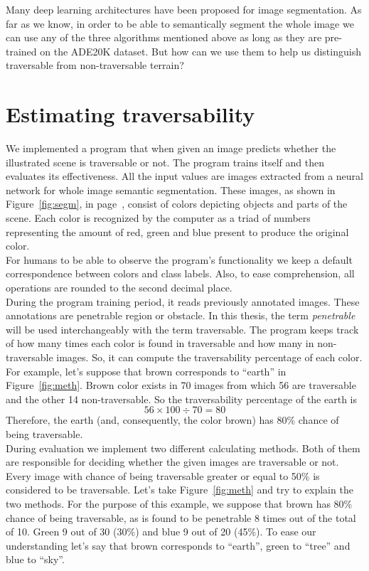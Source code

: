 \documentclass[12pt,a4paper,table,dvipsnames,tikz]{report}
\newcommand{\alleg}{\enquote}
\newcommand{\term}{\textit}
\newcommand{\acronym}{\MakeUppercase}
\newcommand{\bl}[1]{{\hypersetup{linkcolor=blue}#1}}
\begin{document}
	
	Many deep learning architectures have been proposed for image segmentation. As far as
	we know, in order to be able to semantically segment the whole image we can use any 
	of the three algorithms mentioned above as long as they are pre-trained on the 
	\acronym{ade20k} dataset. But how can we use them to help us distinguish traversable 
	from non-traversable terrain?
	\\
		
	\section{Estimating traversability}
	\label{sec:fg:impl}
	
	We implemented a program that when given an image predicts whether the illustrated 
	scene is traversable or not. The program trains itself and then evaluates its 
	effectiveness. All the input values are images extracted from a neural network for whole 
	image semantic segmentation. These images, as shown in Figure~\bl{\ref{fig:segm}}, 
	in page~\bl{\pageref{fig:segm}}, consist 
	of colors depicting objects and parts of the scene. Each color is recognized by the 
	computer as a triad of numbers representing the amount of red, green and blue present 
	to produce the original color. 
	\\
	
	For humans to be able to observe the program's functionality we keep a default 
	correspondence between colors and class labels. Also, to ease comprehension, all 
	operations are rounded to the second decimal place.
	\\
	
	During the program training period, it reads previously annotated images. These 
	annotations are penetrable region or obstacle. In this thesis, the term \term{penetrable} 
	will be used interchangeably with the term traversable. The program keeps track of how many times 
	each color is found in traversable and how many in non-traversable images. So, it can 
	compute the traversability percentage of each color. For example, let's suppose that 
	brown corresponds to \alleg{earth} in Figure~\bl{\ref{fig:meth}}. Brown color 
	exists in 70 images from which 56 are traversable and the other 14 non-traversable. 
	So the traversability percentage of the earth is 
	\[ 56 \times 100 \div 70 = 80 \]
	Therefore, the earth (and, consequently, the color brown) has 80\% chance of 
	being traversable.
	\\
	
	During evaluation we implement two different calculating methods. Both of them are 
	responsible for deciding whether the given images are traversable or not. Every image 
	with chance of being traversable greater or equal to 50\% is considered to be traversable. 
	Let's take Figure~\bl{\ref{fig:meth}} and try to explain the two methods. For the purpose
	of this example, we suppose that brown has 80\% chance of being traversable, as is found to be 
	penetrable 8 times out of the total of 10. Green 9 out of 30 (30\%) and blue 9 out 
	of 20 (45\%). To ease our understanding let's say that brown corresponds to \alleg{earth}, 
	green to \alleg{tree} and blue to \alleg{sky}. 
	\\
	
\end{document}
